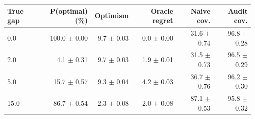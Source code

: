 \begin{tabular}{lrrrrr}
\toprule
True gap & P(optimal) (\%) & Optimism & Oracle regret & Naive cov. & Audit cov. \\
\midrule
0.0 & 100.0 $\pm$ 0.00 & 9.7 $\pm$ 0.03 & 0.0 $\pm$ 0.00 & 31.6 $\pm$ 0.74 & 96.8 $\pm$ 0.28 \\
2.0 & 4.1 $\pm$ 0.31 & 9.7 $\pm$ 0.03 & 1.9 $\pm$ 0.01 & 31.5 $\pm$ 0.73 & 96.5 $\pm$ 0.29 \\
5.0 & 15.7 $\pm$ 0.57 & 9.3 $\pm$ 0.04 & 4.2 $\pm$ 0.03 & 36.7 $\pm$ 0.76 & 96.2 $\pm$ 0.30 \\
15.0 & 86.7 $\pm$ 0.54 & 2.3 $\pm$ 0.08 & 2.0 $\pm$ 0.08 & 87.1 $\pm$ 0.53 & 95.8 $\pm$ 0.32 \\
\bottomrule
\end{tabular}
